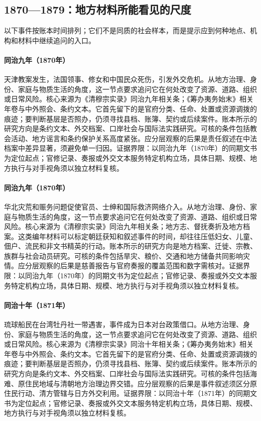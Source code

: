\subsection{1870—1879：地方材料所能看见的尺度}
以下事件按账本时间排列；它们不是同质的社会样本，而是提示应到何种地点、机构和材料中继续追问的入口。
\hypertarget{social:EQ-1870-TIANJIN-MASSACRE}{}\paragraph{同治九年（1870年）}天津教案发生，法国领事、修女和中国民众死伤，引发外交危机。从地方治理、身份、家庭与物质生活的角度，这一节点要求追问它在何处改变了资源、道路、组织或日常风险。核心来源为《清穆宗实录》同治九年相关条；《筹办夷务始末》相关年卷与中外照会、条约文本。它首先留下的是官府分类、任命、处置或资源调拨的痕迹；要判断基层是否照办，仍须寻找县档、账簿、契约或后续案件。账本所示的研究方向是条约文本、外交档案、口岸社会与国际法实践研究。可核的条件包括教会活动、地方谣言和条约保护关系高度紧张。应分层观察的后果是责任叙述在中法档案中差异显著，须避免单一归因。证据界限：以同治九年（1870年）的同期文书为定位起点；官修记录、奏报或外交文本服务特定机构立场，具体日期、规模、地方执行与对手视角须以独立材料复核。
\hypertarget{social:EQ-1870-ZHILI-FAMINE-RELIEF}{}\paragraph{同治九年（1870年）}华北灾荒和赈务问题促使官员、士绅和国际救济网络介入。从地方治理、身份、家庭与物质生活的角度，这一节点要求追问它在何处改变了资源、道路、组织或日常风险。核心来源为《清穆宗实录》同治九年相关条；地方志、督抚奏折及地方档案。这类编年材料可以标定朝廷获知和叙述事件的时间，却往往压低妇女、儿童、佃户、流民和非文书精英的行动。账本所示的研究方向是地方档案、迁徙、宗教、族群与社会动员研究。可核的条件包括旱灾、粮价、交通和地方储备共同影响灾情。应分层观察的后果是慈善报告与官府奏报的覆盖范围和数字需核对。证据界限：以同治九年（1870年）的同期文书为定位起点；官修记录、奏报或外交文本服务特定机构立场，具体日期、规模、地方执行与对手视角须以独立材料复核。
\hypertarget{social:EQ-1871-MUDAN-INCIDENT}{}\paragraph{同治十年（1871年）}琉球船民在台湾牡丹社一带遇害，事件成为日本对台政策借口。从地方治理、身份、家庭与物质生活的角度，这一节点要求追问它在何处改变了资源、道路、组织或日常风险。核心来源为《清穆宗实录》同治十年相关条；《筹办夷务始末》相关年卷与中外照会、条约文本。它首先留下的是官府分类、任命、处置或资源调拨的痕迹；要判断基层是否照办，仍须寻找县档、账簿、契约或后续案件。账本所示的研究方向是条约文本、外交档案、口岸社会与国际法实践研究。可核的条件包括海难、原住民地域与清朝地方治理边界交错。应分层观察的后果是事件叙述须区分原住民行动、清方管辖与日方外交利用。证据界限：以同治十年（1871年）的同期文书为定位起点；官修记录、奏报或外交文本服务特定机构立场，具体日期、规模、地方执行与对手视角须以独立材料复核。
